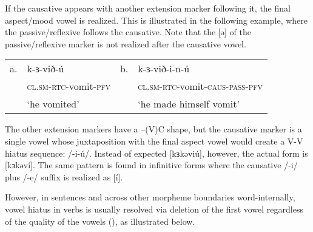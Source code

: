 If the causative appears with another extension marker following it, the final aspect/mood vowel is realized. This is illustrated in the following example, where the passive/reflexive follows the causative. Note that the [ə] of the passive/reflexive marker is not realized after the causative vowel. 

\ea
\begin{tabular}[t]{llll}
a.&	k-ɜ-við-ú			&	b.	&	k-ɜ-við-i-n-ú\\
&	\textsc{cl.sm-rtc}-vomit-\textsc{pfv}	&		&	\textsc{cl.sm-rtc}-vomit-\textsc{caus-pass-\textsc{pfv}}\\
&	‘he vomited’		&		&	‘he made himself vomit’\\
\end{tabular}
\z 
					
The other extension markers have a –(V)C shape, but the causative marker is a single vowel whose juxtaposition with the final aspect vowel would create a V-V hiatus sequence: /-i-ú/. Instead of expected [kɜkəviú], however, the actual form is [kɜkəví]. The same pattern is found in infinitive forms where the causative /-i/ plus /-e/ suffix is realized as [í].

However, in sentences and across other morpheme boundaries word-internally, vowel hiatus in verbs is usually resolved via deletion of the first vowel regardless of the quality of the vowels (), as illustrated below. 

